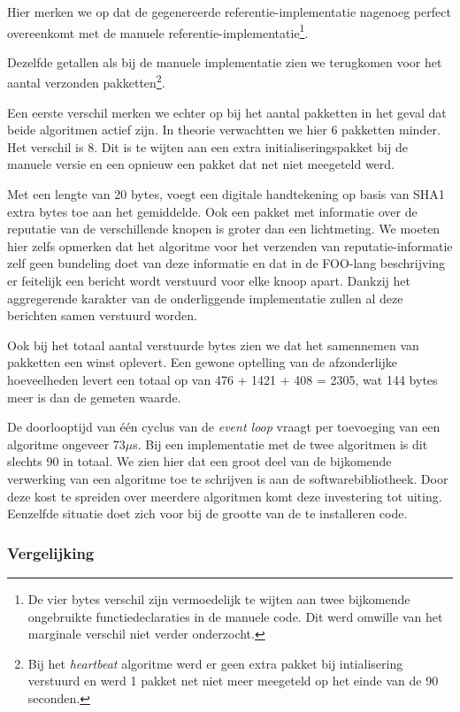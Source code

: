 Hier merken we op dat de gegenereerde referentie-implementatie nagenoeg perfect
overeenkomt met de manuele referentie-implementatie\footnote{De vier bytes
verschil zijn vermoedelijk te wijten aan twee bijkomende ongebruikte
functiedeclaraties in de manuele code. Dit werd omwille van het marginale
verschil niet verder onderzocht.}.

Dezelfde getallen als bij de manuele implementatie zien we terugkomen voor het
aantal verzonden pakketten\footnote{Bij het \emph{heartbeat} algoritme werd er
geen extra pakket bij intialisering verstuurd en werd 1 pakket net niet meer
meegeteld op het einde van de 90 seconden.}.

Een eerste verschil merken we echter op bij het aantal pakketten in het geval
dat beide algoritmen actief zijn. In theorie verwachtten we hier 6 pakketten
minder. Het verschil is 8. Dit is te wijten aan een extra initialiseringspakket
bij de manuele versie en een opnieuw een pakket dat net niet meegeteld werd.

Met een lengte van 20 bytes, voegt een digitale handtekening op basis van SHA1
extra bytes toe aan het gemiddelde. Ook een pakket met informatie over de
reputatie van de verschillende knopen is groter dan een lichtmeting. We moeten
hier zelfs opmerken dat het algoritme voor het verzenden van
reputatie-informatie zelf geen bundeling doet van deze informatie en dat in de
FOO-lang beschrijving er feitelijk een bericht wordt verstuurd voor elke knoop
apart. Dankzij het aggregerende karakter van de onderliggende implementatie
zullen al deze berichten samen verstuurd worden.

Ook bij het totaal aantal verstuurde bytes zien we dat het samennemen van
pakketten een winst oplevert. Een gewone optelling van de afzonderlijke
hoeveelheden levert een totaal op van 476 + 1421 + 408 = 2305, wat 144 bytes
meer is dan de gemeten waarde.

De doorlooptijd van \'e\'en cyclus van de \emph{event loop} vraagt per
toevoeging van een algoritme ongeveer 73$\mu$s. Bij een implementatie met de
twee algoritmen is dit slechts 90 in totaal. We zien hier dat een groot deel
van de bijkomende verwerking van een algoritme toe te schrijven is aan de
softwarebibliotheek. Door deze kost te spreiden over meerdere algoritmen komt
deze investering tot uiting. Eenzelfde situatie doet zich voor bij de grootte
van de te installeren code.

\vspace{-3mm}

\subsubsection{Vergelijking}

